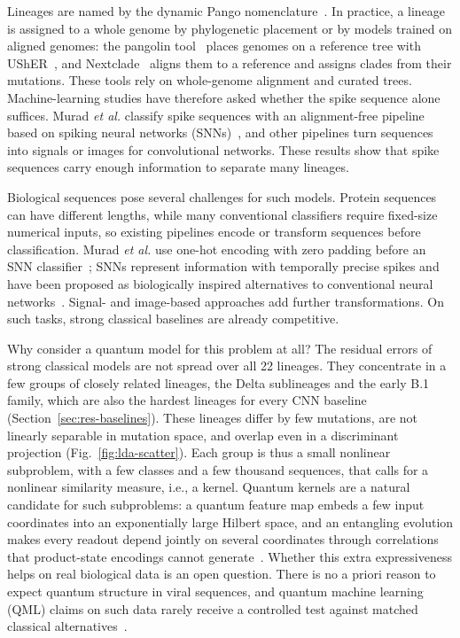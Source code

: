 \documentclass[conference]{IEEEtran}
\begin{document}
Lineages are named by the dynamic Pango nomenclature~\cite{rambaut2020pango}. In practice, a lineage is assigned to a whole genome by phylogenetic placement or by models trained on aligned genomes: the pangolin tool~\cite{otoole2021pangolin} places genomes on a reference tree with UShER~\cite{turakhia2021usher}, and Nextclade~\cite{aksamentov2021nextclade} aligns them to a reference and assigns clades from their mutations. These tools rely on whole-genome alignment and curated trees. Machine-learning studies have therefore asked whether the spike sequence alone suffices. Murad \textit{et al.} classify spike sequences with an alignment-free pipeline based on spiking neural networks (SNNs)~\cite{murad2024snn}, and other pipelines turn sequences into signals or images for convolutional networks. These results show that spike sequences carry enough information to separate many lineages.

Biological sequences pose several challenges for such models. Protein sequences can have different lengths, while many conventional classifiers require fixed-size numerical inputs, so existing pipelines encode or transform sequences before classification. Murad \textit{et al.} use one-hot encoding with zero padding before an SNN classifier~\cite{murad2024snn}; SNNs represent information with temporally precise spikes and have been proposed as biologically inspired alternatives to conventional neural networks~\cite{maass1997,pfeiffer2018}. Signal- and image-based approaches add further transformations. On such tasks, strong classical baselines are already competitive.

Why consider a quantum model for this problem at all? The residual errors of strong classical models are not spread over all 22 lineages. They concentrate in a few groups of closely related lineages, the Delta sublineages and the early B.1 family, which are also the hardest lineages for every CNN baseline (Section~\ref{sec:res-baselines}). These lineages differ by few mutations, are not linearly separable in mutation space, and overlap even in a discriminant projection (Fig.~\ref{fig:lda-scatter}). Each group is thus a small nonlinear subproblem, with a few classes and a few thousand sequences, that calls for a nonlinear similarity measure, i.e., a kernel. Quantum kernels are a natural candidate for such subproblems: a quantum feature map embeds a few input coordinates into an exponentially large Hilbert space, and an entangling evolution makes every readout depend jointly on several coordinates through correlations that product-state encodings cannot generate~\cite{havlicek2019,huang2021power}. Whether this extra expressiveness helps on real biological data is an open question. There is no a priori reason to expect quantum structure in viral sequences, and quantum machine learning (QML) claims on such data rarely receive a controlled test against matched classical alternatives~\cite{bowles2024better}.
\end{document}
